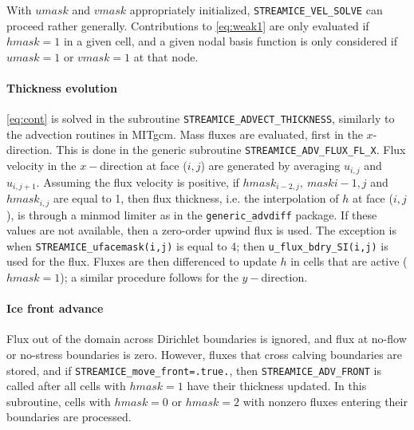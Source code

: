 With $umask$ and $vmask$ appropriately initialized, \texttt{STREAMICE\_VEL\_SOLVE} can proceed rather generally. Contributions to \eqref{eq:weak1} are only
evaluated if $hmask=1$ in a given cell, and a given nodal basis function is only considered if $umask=1$ or $vmask=1$ at that node.

\paragraph{Thickness evolution}

\eqref{eq:cont} is solved in the subroutine \texttt{STREAMICE\_ADVECT\_THICKNESS}, similarly to the advection routines in MITgcm. Mass fluxes are evaluated, first in the $x$-direction. This is done in the generic subroutine \texttt{STREAMICE\_ADV\_FLUX\_FL\_X}. Flux velocity in the $x-$direction at face ($i,j$) are generated by averaging $u_{i,j}$ and $u_{i,j+1}$. Assuming the flux velocity is positive, if $hmask_{i-2,j},\ mask{i-1,j}$ and $hmask_{i,j}$ are equal to 1, then flux thickness, i.e. the interpolation of $h$ at face ($i,j$), is through a minmod limiter as in the \texttt{generic\_advdiff} package. If these values are not available, then a zero-order upwind flux is used. The exception is when \texttt{STREAMICE\_ufacemask(i,j)} is equal to 4; then \texttt{u\_flux\_bdry\_SI(i,j)} is used for the flux. Fluxes are then differenced to update $h$ in cells that are active ($hmask=1$); a similar procedure follows for the $y-$direction.

\paragraph{Ice front advance}

Flux out of the domain across Dirichlet boundaries is ignored, and flux at no-flow or no-stress boundaries is zero. However, fluxes that cross calving boundaries are stored, and if \texttt{STREAMICE\_move\_front=.true.}, then \texttt{STREAMICE\_ADV\_FRONT} is called after all cells with $hmask=1$ have their thickness updated. In this subroutine, cells with $hmask=0$ or $hmask=2$ with nonzero fluxes entering their boundaries are processed. 

